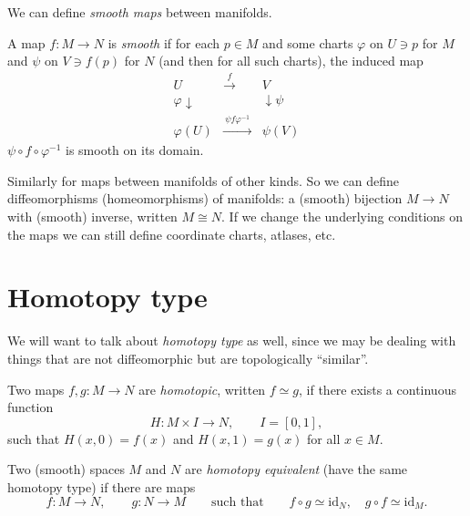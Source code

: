 We can define \emph{smooth maps} between manifolds.

\begin{definition}
\label{L07:def:smoothmap}
A map $f\colon M\to N$ is \emph{smooth} if for each $p\in M$ and some charts $\varphi$ on
$U\ni p$ for $M$ and $\psi$ on $V\ni f(p)$ for $N$ (and then for all such charts),
 the induced map
\[
  \begin{array}{ccc}
    U & \xrightarrow{\ f\ } & V\\[2pt]
    {\scriptstyle\varphi}\downarrow & & \downarrow{\scriptstyle\psi}\\[2pt]
    \varphi(U) & \xrightarrow{\ \psi f\varphi^{-1}\ } & \psi(V)
  \end{array}
\]
$\psi\circ f\circ\varphi^{-1}$ is smooth on its domain.
\end{definition}

Similarly for maps between manifolds of other kinds. So we can define diffeomorphisms
(homeomorphisms) of manifolds: a (smooth) bijection $M\to N$ with (smooth) inverse,
written $M\cong N$.
If we change the underlying conditions on the maps  we can still define coordinate charts, atlases, etc.

\section{Homotopy type}
\label{L07:sec:homotopy}

We will want to talk about \emph{homotopy type} as well, since we may be dealing with
things that are not diffeomorphic but are topologically ``similar''.

\begin{definition}[Homotopy]
\label{L07:def:homotopy}
Two maps $f,g\colon M\to N$ are \emph{homotopic}, written $f\simeq g$, if there exists a
continuous function
\[
  H\colon M\times I\to N,\qquad I=[0,1],
\]
such that $H(x,0)=f(x)$ and $H(x,1)=g(x)$ for all $x\in M$.
\end{definition}

\begin{definition}
\label{L07:def:hequiv}
Two (smooth) spaces $M$ and $N$ are \emph{homotopy equivalent} (have the same homotopy
type) if there are maps
\[
  f\colon M\to N,\qquad g\colon N\to M
  \qquad\text{such that}\qquad
  f\circ g\simeq\mathrm{id}_N,\quad g\circ f\simeq\mathrm{id}_M .
\]
\end{definition}

